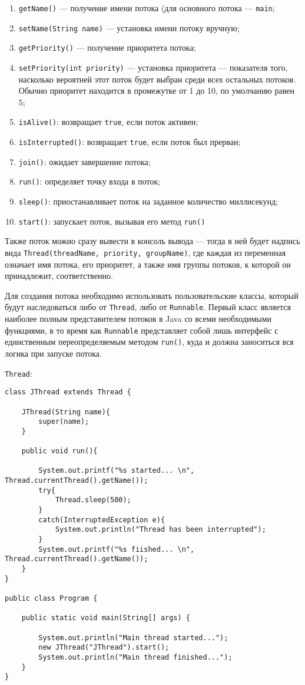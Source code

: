 \begin{enumerate}
    \item \verb|getName()| — получение имени потока (для основного потока — \verb|main|;
    \item \verb|setName(String name)| — установка имени потоку вручную;
    \item \verb|getPriority()| — получение приоритета потока;
    \item \verb|setPriority(int priority)| — установка приоритета — показателя того, насколько вероятней этот поток будет выбран среди всех остальных потоков. Обычно приоритет находится в промежутке от 1 до 10, по умолчанию равен 5;
    \item \verb|isAlive()|: возвращает \verb|true|, если поток активен;
    \item \verb|isInterrupted()|: возвращает \verb|true|, если поток был прерван;
    \item \verb|join()|: ожидает завершение потока;
    \item \verb|run()|: определяет точку входа в поток;
    \item \verb|sleep()|: приостанавливает поток на заданное количество миллисекунд;
    \item \verb|start()|: запускает поток, вызывая его метод \verb|run()|
\end{enumerate}

Также поток можно сразу вывести в консоль вывода — тогда в ней будет надпись вида \verb|Thread(threadName, priority, groupName)|, где каждая из переменная означает имя потока, его приоритет, а также имя группы потоков, к которой он принадлежит, соответственно.

Для создания потока необходимо использовать пользовательские классы, который будут наследоваться либо от \verb|Thread|, либо от \verb|Runnable|. Первый класс является наиболее полным представителем потоков в Java со всеми необходимыми функциями, в то время как \verb|Runnable| представляет собой лишь интерфейс с единственным переопределяемым методом \verb|run()|, куда и должна заноситься вся логика при запуске потока.

\verb|Thread|:

\begin{lstlisting}
class JThread extends Thread {
      
    JThread(String name){
        super(name);
    }
      
    public void run(){
          
        System.out.printf("%s started... \n", Thread.currentThread().getName());
        try{
            Thread.sleep(500);
        }
        catch(InterruptedException e){
            System.out.println("Thread has been interrupted");
        }
        System.out.printf("%s fiished... \n", Thread.currentThread().getName());
    }
}
  
public class Program {
  
    public static void main(String[] args) {
          
        System.out.println("Main thread started...");
        new JThread("JThread").start();
        System.out.println("Main thread finished...");
    }
}
\end{lstlisting}

